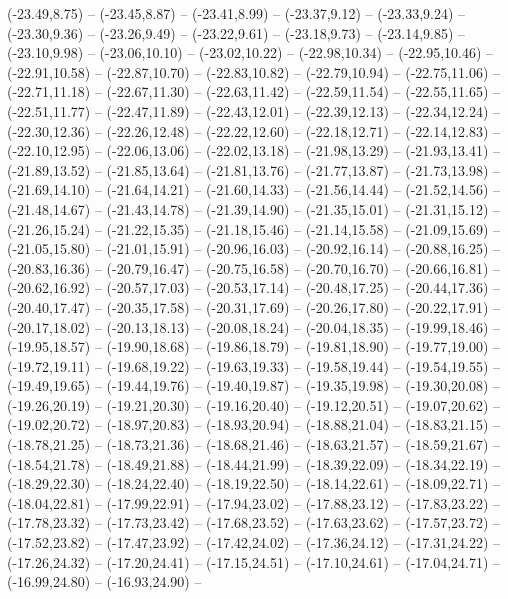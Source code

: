 {  (-23.49,8.75) -- (-23.45,8.87) -- (-23.41,8.99) -- (-23.37,9.12) -- (-23.33,9.24) -- (-23.30,9.36) -- (-23.26,9.49) --
  (-23.22,9.61) -- (-23.18,9.73) -- (-23.14,9.85) -- (-23.10,9.98) -- (-23.06,10.10) -- (-23.02,10.22) -- (-22.98,10.34) --
  (-22.95,10.46) -- (-22.91,10.58) -- (-22.87,10.70) -- (-22.83,10.82) -- (-22.79,10.94) -- (-22.75,11.06) -- (-22.71,11.18) --
  (-22.67,11.30) -- (-22.63,11.42) -- (-22.59,11.54) -- (-22.55,11.65) -- (-22.51,11.77) -- (-22.47,11.89) -- (-22.43,12.01) --
  (-22.39,12.13) -- (-22.34,12.24) -- (-22.30,12.36) -- (-22.26,12.48) -- (-22.22,12.60) -- (-22.18,12.71) -- (-22.14,12.83) --
  (-22.10,12.95) -- (-22.06,13.06) -- (-22.02,13.18) -- (-21.98,13.29) -- (-21.93,13.41) -- (-21.89,13.52) -- (-21.85,13.64) --
  (-21.81,13.76) -- (-21.77,13.87) -- (-21.73,13.98) -- (-21.69,14.10) -- (-21.64,14.21) -- (-21.60,14.33) -- (-21.56,14.44) --
  (-21.52,14.56) -- (-21.48,14.67) -- (-21.43,14.78) -- (-21.39,14.90) -- (-21.35,15.01) -- (-21.31,15.12) -- (-21.26,15.24) --
  (-21.22,15.35) -- (-21.18,15.46) -- (-21.14,15.58) -- (-21.09,15.69) -- (-21.05,15.80) -- (-21.01,15.91) -- (-20.96,16.03) --
  (-20.92,16.14) -- (-20.88,16.25) -- (-20.83,16.36) -- (-20.79,16.47) -- (-20.75,16.58) -- (-20.70,16.70) -- (-20.66,16.81) --
  (-20.62,16.92) -- (-20.57,17.03) -- (-20.53,17.14) -- (-20.48,17.25) -- (-20.44,17.36) -- (-20.40,17.47) -- (-20.35,17.58) --
  (-20.31,17.69) -- (-20.26,17.80) -- (-20.22,17.91) -- (-20.17,18.02) -- (-20.13,18.13) -- (-20.08,18.24) -- (-20.04,18.35) --
  (-19.99,18.46) -- (-19.95,18.57) -- (-19.90,18.68) -- (-19.86,18.79) -- (-19.81,18.90) -- (-19.77,19.00) -- (-19.72,19.11) --
  (-19.68,19.22) -- (-19.63,19.33) -- (-19.58,19.44) -- (-19.54,19.55) -- (-19.49,19.65) -- (-19.44,19.76) -- (-19.40,19.87) --
  (-19.35,19.98) -- (-19.30,20.08) -- (-19.26,20.19) -- (-19.21,20.30) -- (-19.16,20.40) -- (-19.12,20.51) -- (-19.07,20.62) --
  (-19.02,20.72) -- (-18.97,20.83) -- (-18.93,20.94) -- (-18.88,21.04) -- (-18.83,21.15) -- (-18.78,21.25) -- (-18.73,21.36) --
  (-18.68,21.46) -- (-18.63,21.57) -- (-18.59,21.67) -- (-18.54,21.78) -- (-18.49,21.88) -- (-18.44,21.99) -- (-18.39,22.09) --
  (-18.34,22.19) -- (-18.29,22.30) -- (-18.24,22.40) -- (-18.19,22.50) -- (-18.14,22.61) -- (-18.09,22.71) -- (-18.04,22.81) --
  (-17.99,22.91) -- (-17.94,23.02) -- (-17.88,23.12) -- (-17.83,23.22) -- (-17.78,23.32) -- (-17.73,23.42) -- (-17.68,23.52) --
  (-17.63,23.62) -- (-17.57,23.72) -- (-17.52,23.82) -- (-17.47,23.92) -- (-17.42,24.02) -- (-17.36,24.12) -- (-17.31,24.22) --
  (-17.26,24.32) -- (-17.20,24.41) -- (-17.15,24.51) -- (-17.10,24.61) -- (-17.04,24.71) -- (-16.99,24.80) -- (-16.93,24.90) --
}
